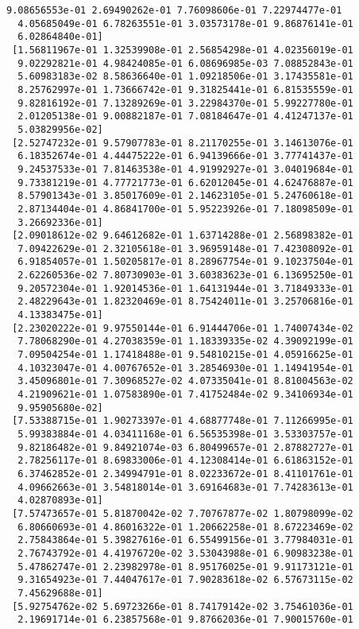 \documentclass[11pt]{article}
\begin{document}
\begin{Verbatim}[commandchars=\\\{\}]
  9.08656553e-01 2.69490262e-01 7.76098606e-01 7.22974477e-01
  4.05685049e-01 6.78263551e-01 3.03573178e-01 9.86876141e-01
  6.02864840e-01]
 [1.56811967e-01 1.32539908e-01 2.56854298e-01 4.02356019e-01
  9.02292821e-01 4.98424085e-01 6.08696985e-03 7.08852843e-01
  5.60983183e-02 8.58636640e-01 1.09218506e-01 3.17435581e-01
  8.25762997e-01 1.73666742e-01 9.31825441e-01 6.81535559e-01
  9.82816192e-01 7.13289269e-01 3.22984370e-01 5.99227780e-01
  2.01205138e-01 9.00882187e-01 7.08184647e-01 4.41247137e-01
  5.03829956e-02]
 [2.52747232e-01 9.57907783e-01 8.21170255e-01 3.14613076e-01
  6.18352674e-01 4.44475222e-01 6.94139666e-01 3.77741437e-01
  9.24537533e-01 7.81463538e-01 4.91992927e-01 3.04019684e-01
  9.73381219e-01 4.77721773e-01 6.62012045e-01 4.62476887e-01
  8.57901343e-01 3.85017609e-01 2.14623105e-01 5.24760618e-01
  2.87134404e-01 4.86841700e-01 5.95223926e-01 7.18098509e-01
  3.26692336e-01]
 [2.09018612e-02 9.64612682e-01 1.63714288e-01 2.56898382e-01
  7.09422629e-01 2.32105618e-01 3.96959148e-01 7.42308092e-01
  6.91854057e-01 1.50205817e-01 8.28967754e-01 9.10237504e-01
  2.62260536e-02 7.80730903e-01 3.60383623e-01 6.13695250e-01
  9.20572304e-01 1.92014536e-01 1.64131944e-01 3.71849333e-01
  2.48229643e-01 1.82320469e-01 8.75424011e-01 3.25706816e-01
  4.13383475e-01]
 [2.23020222e-01 9.97550144e-01 6.91444706e-01 1.74007434e-02
  7.78068290e-01 4.27038359e-01 1.18339335e-02 4.39092199e-01
  7.09504254e-01 1.17418488e-01 9.54810215e-01 4.05916625e-01
  4.10323047e-01 4.00767652e-01 3.28546930e-01 1.14941954e-01
  3.45096801e-01 7.30968527e-02 4.07335041e-01 8.81004563e-02
  4.21909621e-01 1.07583890e-01 7.41752484e-02 9.34106934e-01
  9.95905680e-02]
 [7.53388715e-01 1.90273397e-01 4.68877748e-01 7.11266995e-01
  5.99383884e-01 4.03411168e-01 6.56535398e-01 3.53303757e-01
  9.82186482e-01 9.84921074e-03 6.80499657e-01 2.87882727e-01
  2.78256117e-01 8.69833006e-01 4.12308414e-01 6.61863152e-01
  6.37462852e-01 2.34994791e-01 8.02233672e-01 8.41101761e-01
  4.09662663e-01 3.54818014e-01 3.69164683e-01 7.74283613e-01
  4.02870893e-01]
 [7.57473657e-01 5.81870042e-02 7.70767877e-02 1.80798099e-02
  6.80660693e-01 4.86016322e-01 1.20662258e-01 8.67223469e-02
  2.75843864e-01 5.39827616e-01 6.55499156e-01 3.77984031e-01
  2.76743792e-01 4.41976720e-02 3.53043988e-01 6.90983238e-01
  5.47862747e-01 2.23982978e-01 8.95176025e-01 9.91173121e-01
  9.31654923e-01 7.44047617e-01 7.90283618e-02 6.57673115e-02
  7.45629688e-01]
 [5.92754762e-02 5.69723266e-01 8.74179142e-02 3.75461036e-01
  2.19691714e-01 6.23857568e-01 9.87662036e-01 7.90015760e-01

\end{Verbatim}
\end{document}
